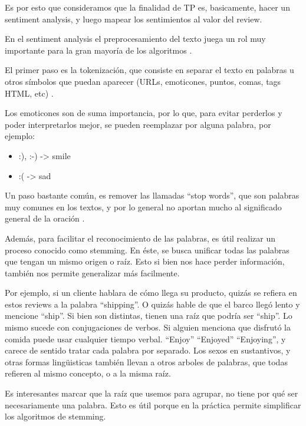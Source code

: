 Es por esto que consideramos que la finalidad de TP es, basicamente, hacer un sentiment analysis, y
luego mapear los sentimientos al valor del review.

En el sentiment analysis el preprocesamiento del texto juega un rol muy importante para la gran
mayor\'ia de los algoritmos \cite{importance_of_preprocessing}.

El primer paso es la tokenizaci\'on, que consiste en separar el texto en palabras u otros s\'imbolos
que puedan aparecer (URLs, emoticones, puntos, comas, tags HTML, etc) \cite{mining_twitter_data}.

Los emoticones son de suma importancia, por lo que, para evitar perderlos y poder
interpretarlos mejor, se pueden reemplazar por alguna palabra, por ejemplo:

\begin{itemize}
\setlength\itemsep{0em}
  \item :), :-) -> smile
  \item :( -> sad
\end{itemize}

Un paso bastante com\'un, es remover las llamadas ``stop words'', que son palabras muy comunes en
los textos, y por lo general no aportan mucho al significado general de la oraci\'on \cite{stopwords}.

Además, para facilitar el reconocimiento de las palabras, es \'util realizar un proceso conocido como stemming.
En \'este, se busca unificar todas las palabras que tengan un mismo origen o ra\'iz. Esto si bien nos hace perder informaci\'on,
también nos permite generalizar más facilmente.

Por ejemplo, si un cliente hablara de cómo llega su producto, quizás se refiera en estos reviews a la palabra ``shipping''. O quizás hable de que el barco llegó lento y mencione ``ship''. Si bien son distintas, tienen una raíz que podría ser ``ship''. Lo mismo sucede con conjugaciones de verbos. Si alguien menciona que disfrutó la comida puede usar cualquier tiempo verbal. ``Enjoy'' ``Enjoyed'' ``Enjoying'', y carece de sentido tratar cada palabra por separado. Los sexos en sustantivos, y otras formas lingüisticas también llevan a otros arboles de palabras, que todas refieren al mismo concepto, o a la misma raíz.

Es interesantes marcar que la raíz que usemos para agrupar, no tiene por qué ser necesariamente una palabra. Esto es útil porque en la práctica permite simplificar los algoritmos de stemming. \cite{word_stemming}

